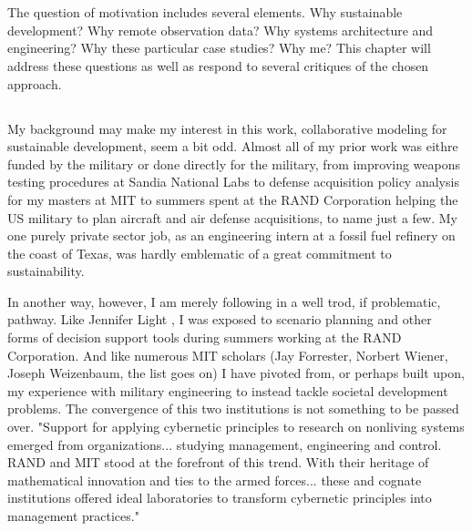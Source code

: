 \chapter{}

The question of motivation includes several elements. Why sustainable development? Why remote observation data? Why systems architecture and engineering? Why these particular case studies? Why me? This chapter will address these questions as well as respond to several critiques of the chosen approach.

\section{}

\subsection{}

My background may make my interest in this work, collaborative modeling for sustainable development, seem a bit odd. Almost all of my prior work was eithre funded by the military or done directly for the military, from improving weapons testing procedures at Sandia National Labs to defense acquisition policy analysis for my masters at MIT to summers spent at the RAND Corporation helping the US military to plan aircraft and air defense acquisitions, to name just a few. My one purely private sector job, as an engineering intern at a fossil fuel refinery on the coast of Texas, was hardly emblematic of a great commitment to sustainability.

In another way, however, I am merely following in a well trod, if problematic, pathway. Like Jennifer Light \cite{lightWarfareWelfareDefense2005}, I was exposed to scenario planning and other forms of decision support tools during summers working at the RAND Corporation. And like numerous MIT scholars (Jay Forrester, Norbert Wiener, Joseph Weizenbaum, the list goes on) I have pivoted from, or perhaps built upon, my experience with military engineering to instead tackle societal development problems. The convergence of this two institutions is not something to be passed over. "Support for applying cybernetic principles to research on nonliving systems emerged from organizations... studying management, engineering and control. RAND and MIT stood at the forefront of this trend. With their heritage of mathematical innovation and ties to the armed forces... these and cognate institutions offered ideal laboratories to transform cybernetic principles into management practices." \cite{lightWarfareWelfareDefense2005} 

